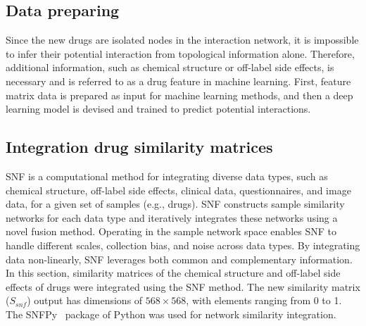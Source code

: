 \documentclass[unnumsec,webpdf,contemporary,large]{oup-authoring-template}%
\theoremstyle{thmstyleone}%
\theoremstyle{thmstyletwo}%
\theoremstyle{thmstylethree}%
\begin{document}
\subsection{Data preparing}\label{subsec2}
Since the new drugs are isolated nodes in the interaction network, it is impossible to infer their potential interaction from topological information alone. Therefore, additional information, such as chemical structure or off-label side effects, is necessary and is referred to as a drug feature in machine learning. First, feature matrix data is prepared as input for machine learning methods, and then a deep learning model is devised and trained to predict potential interactions.
\subsection{Integration drug similarity matrices}
SNF \cite{Wang2014} is a computational method for integrating diverse data types, such as chemical structure, off-label side effects, clinical data, questionnaires, and image data, for a given set of samples (e.g., drugs). SNF constructs sample similarity networks for each data type and iteratively integrates these networks using a novel fusion method. Operating in the sample network space enables SNF to handle different scales, collection bias, and noise across data types. By integrating data non-linearly, SNF leverages both common and complementary information. 
In this section, similarity matrices of the chemical structure and off-label side effects of drugs were integrated using the SNF method. The new similarity matrix ($S_{snf}$) output has dimensions of $568 \times 568$, with elements ranging from 0 to 1. The SNFPy~\cite{snfpy} package of  Python was used for network similarity integration.
\end{document}
